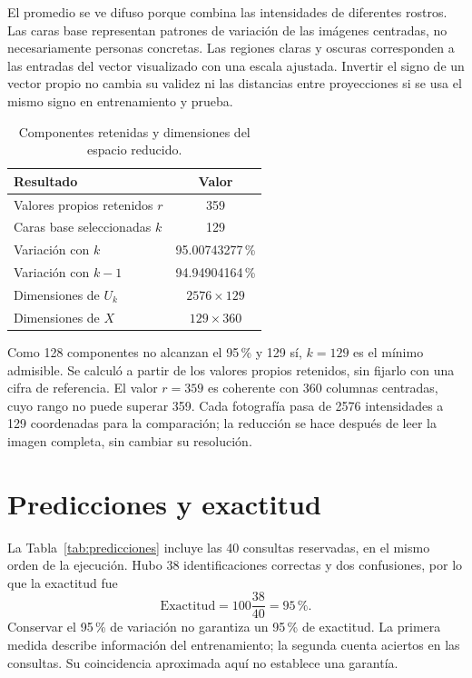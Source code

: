 \documentclass[11pt,a4paper]{article}
\begin{document}
El promedio se ve difuso porque combina las intensidades de diferentes rostros.
Las caras base representan patrones de variación de las imágenes centradas, no
necesariamente personas concretas. Las regiones claras y oscuras corresponden a
las entradas del vector visualizado con una escala ajustada. Invertir el signo de
un vector propio no cambia su validez ni las distancias entre proyecciones si se
usa el mismo signo en entrenamiento y prueba.

\begin{table}[h]
\centering
\caption{Componentes retenidas y dimensiones del espacio reducido.}
\begin{tabular}{lc}
\toprule
Resultado & Valor\\
\midrule
Valores propios retenidos $r$ & 359\\
Caras base seleccionadas $k$ & 129\\
Variación con $k$ & 95.00743277\,\%\\
Variación con $k-1$ & 94.94904164\,\%\\
Dimensiones de $U_k$ & $2576\times129$\\
Dimensiones de $X$ & $129\times360$\\
\bottomrule
\end{tabular}
\end{table}

Como 128 componentes no alcanzan el 95\,\% y 129 sí, $k=129$ es el mínimo
admisible. Se calculó a partir de los valores propios retenidos, sin fijarlo con
una cifra de referencia. El valor $r=359$ es coherente con 360 columnas centradas,
cuyo rango no puede superar 359. Cada fotografía pasa de 2576 intensidades a
129 coordenadas para la comparación; la reducción se hace después de leer la
imagen completa, sin cambiar su resolución.

\clearpage
\section{Predicciones y exactitud}
La Tabla~\ref{tab:predicciones} incluye las 40 consultas reservadas, en el mismo
orden de la ejecución. Hubo 38 identificaciones correctas y dos confusiones, por lo
que la exactitud fue
\begin{equation}
\mathrm{Exactitud}=100\frac{38}{40}=95\,\%.
\end{equation}
Conservar el 95\,\% de variación no garantiza un 95\,\% de exactitud. La primera
medida describe información del entrenamiento; la segunda cuenta aciertos en
las consultas. Su coincidencia aproximada aquí no establece una garantía.
\end{document}
